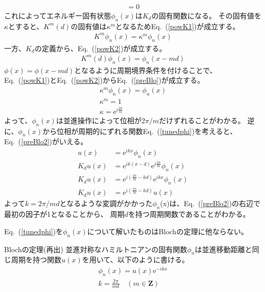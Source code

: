 \documentclass[autodetect-engine,dvipdfmx-if-dvi,ja=standard,a4paper,layout=v2]{bxjsreport}
\newcommand{\eref}[1]{Eq.~(\ref{#1})}
\begin{document}
    \begin{align}
    [K_d,H]=0\label{sym}
    \end{align}
    これによってエネルギー固有状態$\phi_n(x)$は$K_d$の固有関数になる。
    その固有値を$\kappa$とすると、$K^m(d)$の固有値は$\kappa^m$となるため\eref{powK1}が成立する。
    \begin{align}
    K^m\phi_n(x)=\kappa^m\phi_n(x)\label{powK1}
    \end{align}
    一方、$K_d$の定義から、\eref{powK2}が成立する。
    \begin{align}
    K^m(d)\phi_n(x)=\phi_n(x-md)\label{powK2}
    \end{align}
    $\phi(x)=\phi(x-md)$となるように周期境界条件を付けることで、\eref{powK1}と\eref{powK2}から\eref{preBlo}が成立する。
    \begin{align}
    \kappa^m\phi_n(x)=\phi_n(x)\nonumber\\
    \kappa^m = 1\nonumber\\
    \kappa = \mathrm{e}^{i\frac{2\pi}{m}}\label{preBlo}
    \end{align}
    よって、$\phi_n(x)$は並進操作によって位相が$2\pi/m$だけずれることがわかる。
    逆に、$\phi_n(x)$から位相が周期的にずれる関数\eref{tunedphi}を考えると、\eref{preBlo2}がいえる。
    \begin{align}
    u(x) &= \mathrm{e}^{ikx}\phi_n(x)\label{tunedphi}\\
    K_du(x) &= \mathrm{e}^{ik(x-d)}\mathrm{e}^{i\frac{2\pi}{m}}\phi_n(x)\nonumber\\
    K_du(x) &= \mathrm{e}^{i\left(\frac{2\pi}{m}-kd\right)}\mathrm{e}^{ikx}\phi_n(x)\nonumber\\
    K_du(x) &= \mathrm{e}^{i\left(\frac{2\pi}{m}-kd\right)}u(x)\label{preBlo2}
    \end{align}
    よって$k=2\pi/md$となるような変調がかかった$\phi_n$(x)は、\eref{preBlo2}の右辺で最初の因子が1となることから、
    周期$d$を持つ周期関数であることがわかる。\par
    \eref{tunedphi}を$\phi_n(x)$について解いたものはBlochの定理に他ならない。
    \begin{itembox}[l]{Blochの定理(再出)}
        並進対称なハミルトニアンの固有関数$\phi_n$は並進移動距離と同じ周期を持つ関数$u(x)$を用いて、以下のように書ける。
        \begin{align}
        \phi_n(x)=u(x)\mathrm{e}^{-ikx}\\
        k=\frac{2\pi}{md}\quad(m \in \mathbf{Z})
        \end{align}
    \end{itembox}
\end{document}
